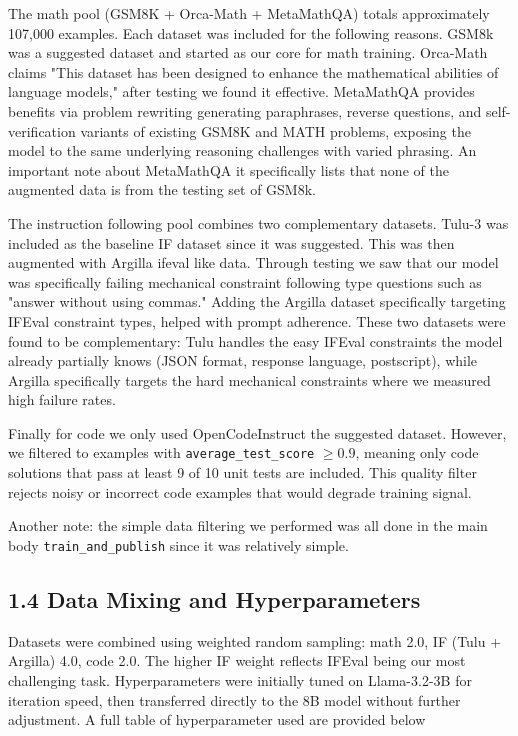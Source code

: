 \documentclass[10pt,letterpaper]{article}
\begin{document}
The math pool (GSM8K + Orca-Math + MetaMathQA) totals approximately 107,000 examples. Each dataset was included for the following reasons. GSM8k was a suggested dataset and started as our core for math training. Orca-Math claims "This dataset has been designed to enhance the mathematical abilities of language models," after testing we found it effective.  MetaMathQA provides benefits via problem rewriting generating paraphrases, reverse questions, and self-verification variants of existing GSM8K and MATH problems, exposing the model to the same underlying reasoning challenges with varied phrasing. An important note about MetaMathQA it specifically lists that none of the augmented data is from the testing set of GSM8k.


The instruction following pool combines two complementary datasets. Tulu-3 was included as the baseline IF dataset since it was suggested. This was then augmented with Argilla ifeval like data. Through testing we saw that our model was specifically failing mechanical constraint following type questions such as "answer without using commas." Adding the Argilla dataset 
specifically targeting IFEval constraint types, helped with prompt adherence. These two datasets were found to be complementary: Tulu handles the easy IFEval constraints the model already partially knows (JSON format, response language, postscript), while Argilla specifically targets the hard mechanical constraints where we measured high failure rates.

Finally for code we only used  OpenCodeInstruct the suggested dataset. However, we filtered to examples with \texttt{average\_test\_score} $\geq 0.9$, meaning only code solutions that pass at least 9 of 10 unit tests are included. This quality filter rejects noisy or incorrect code examples that would degrade training signal.

Another note: the simple data filtering we performed was all done in the main body \texttt{train\_and\_publish} since it was relatively simple.

\subsection{1.4 Data Mixing and Hyperparameters}

Datasets were combined using weighted random sampling: math 2.0, IF (Tulu + Argilla) 
4.0, code 2.0. The higher IF weight reflects IFEval being our most challenging task. 
Hyperparameters were initially tuned on Llama-3.2-3B for iteration speed, then 
transferred directly to the 8B model without further adjustment. A full table of hyperparameter used are provided below
\end{document}
